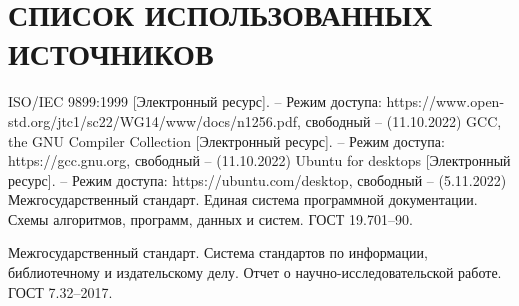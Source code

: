\section*{СПИСОК ИСПОЛЬЗОВАННЫХ ИСТОЧНИКОВ}

\begingroup
\renewcommand{\section}[2]{}
\begin{thebibliography}{}
	ISO/IEC 9899:1999 [Электронный ресурс]. – Режим доступа:
	https://www.open-std.org/jtc1/sc22/WG14/www/docs/n1256.pdf,
	свободный – (11.10.2022)
	GCC, the GNU Compiler Collection [Электронный ресурс]. – Режим доступа:
	https://gcc.gnu.org,
	свободный – (11.10.2022)
	Ubuntu for desktops [Электронный ресурс]. – Режим доступа:
	https://ubuntu.com/desktop,
	свободный – (5.11.2022)
	Межгосударственный стандарт. Единая система программной документации.
	Схемы алгоритмов, программ, данных и систем. ГОСТ 19.701--90.

	Межгосударственный стандарт. Система стандартов по информации, библиотечному и издательскому делу.
	Отчет о научно-исследовательской работе. ГОСТ 7.32--2017.
\end{thebibliography}
\endgroup

\pagebreak
